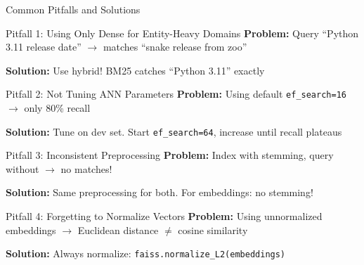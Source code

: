 \documentclass[aspectratio=169]{beamer}
\begin{document}
\begin{frame}[shrink=5]{Common Pitfalls and Solutions}
\begin{alertblock}{Pitfall 1: Using Only Dense for Entity-Heavy Domains}
\textbf{Problem:} Query ``Python 3.11 release date'' $\rightarrow$ matches ``snake release from zoo''

\textbf{Solution:} Use hybrid! BM25 catches ``Python 3.11'' exactly
\end{alertblock}

\begin{alertblock}{Pitfall 2: Not Tuning ANN Parameters}
\textbf{Problem:} Using default \texttt{ef\_search=16} $\rightarrow$ only 80\% recall

\textbf{Solution:} Tune on dev set. Start \texttt{ef\_search=64}, increase until recall plateaus
\end{alertblock}

\begin{alertblock}{Pitfall 3: Inconsistent Preprocessing}
\textbf{Problem:} Index with stemming, query without $\rightarrow$ no matches!

\textbf{Solution:} Same preprocessing for both. For embeddings: no stemming!
\end{alertblock}

\begin{alertblock}{Pitfall 4: Forgetting to Normalize Vectors}
\textbf{Problem:} Using unnormalized embeddings $\rightarrow$ Euclidean distance $\neq$ cosine similarity

\textbf{Solution:} Always normalize: \texttt{faiss.normalize\_L2(embeddings)}
\end{alertblock}
\end{frame}
\end{document}
